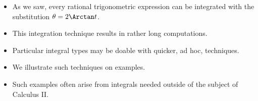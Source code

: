 \begin{frame}
\begin{itemize}
\item As we saw, every rational trigonometric expression can be integrated with the substitution $\theta=2\Arctan t$.
\item<2-> This integration technique results in rather long computations. 
\item<3-> Particular integral types may be doable with quicker, ad hoc, techniques.
\item<4-> We illustrate such techniques on examples. 
\item<5-> Such examples often arise from integrals needed outside of the subject of Calculus II.
\end{itemize}
\end{frame}


